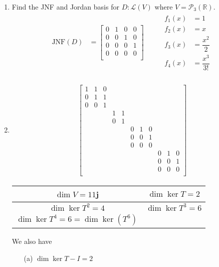 \documentclass{article}
\begin{document}
\begin{examples}[frametitle={Examples}]
	\begin{enumerate}
		\item Find the JNF and Jordan basis for $D: \mathcal{L}(V)$ where $V = \mathcal{P}_{3}(\mathbb{R})$.
			\begin{align*}
				\text{JNF}(D) &= \begin{bmatrix}
				0 & 1 & 0 & 0 \\
				0 & 0 & 1 & 0 \\
				0 & 0 & 0 & 1 \\
				0 & 0 & 0 & 0 \\
				\end{bmatrix}
			\hspace{30pt} 
			\begin{split}
				f_{1}(x) &= 1 \\
				f_{2}(x) &= x \\
				f_{3}(x) &= \dfrac{x^{2}}{2} \\
				f_{4}(x) &= \dfrac{x^{3}}{3!}  
			\end{split} \\
			\end{align*}
		\item 
			\begin{align*}
				\begin{bmatrix}
				1 & 1 & 0 &   &   &   &   &   &   &   &   \\
				0 & 1 & 1 &   &   &   &   &   &   &   &   \\
				0 & 0 & 1 &   &   &   &   &   &   &   &   \\
				  &   &   & 1 & 1 &   &   &   &   &   &   \\
				  &   &   & 0 & 1 &   &   &   &   &   &   \\
				  &   &   &   &   & 0 & 1 & 0 &   &   &   \\
				  &   &   &   &   & 0 & 0 & 1 &   &   &   \\
				  &   &   &   &   & 0 & 0 & 0 &   &   &   \\
				  &   &   &   &   &   &   &   & 0 & 1 & 0 \\
				  &   &   &   &   &   &   &   & 0 & 0 & 1 \\
				  &   &   &   &   &   &   &   & 0 & 0 & 0 \\
				\end{bmatrix}
			\end{align*}
			\begin{center}
				\begin{tabular}{ | c | c | }
				\hline
				$\dim{V} = 11$j & $\dim{\ker{T}} = 2$ \\
				\hline
				$\dim{\ker{T^{2}}} = 4$ & $\dim{\ker{T^{3}}} = 6$ \\ 
				\hline		
				$\dim{\ker{T^{4}}} = 6 = \dim{\ker{(T^{6})}}$ & \\
				\hline 
				\end{tabular}
			\end{center}
			We also have 
			\begin{enumerate}
				\item [(a)] $\dim{\ker{T - I}}= 2$


\end{enumerate}
\end{enumerate}
\end{examples}
\end{document}
